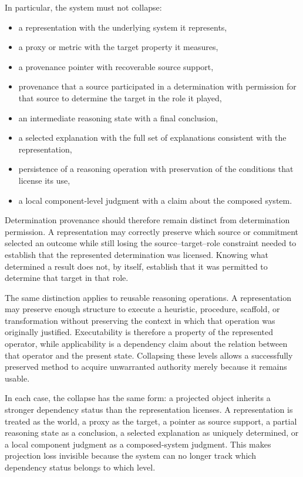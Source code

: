\documentclass[11pt]{article}
\theoremstyle{definition}
\theoremstyle{remark}
\begin{document}
In particular, the system must not collapse:
\begin{itemize}[leftmargin=1.5em]
    \item a representation with the underlying system it represents,
    \item a proxy or metric with the target property it measures,
    \item a provenance pointer with recoverable source support,
    \item provenance that a source participated in a determination with permission for that source to determine the target in the role it played,
    \item an intermediate reasoning state with a final conclusion,
    \item a selected explanation with the full set of explanations consistent with the representation,
    \item persistence of a reasoning operation with preservation of the conditions that license its use,
    \item a local component-level judgment with a claim about the composed system.
\end{itemize}

Determination provenance should therefore remain distinct from determination permission. A representation may correctly preserve which source or commitment selected an outcome while still losing the source--target--role constraint needed to establish that the represented determination was licensed. Knowing what determined a result does not, by itself, establish that it was permitted to determine that target in that role.

The same distinction applies to reusable reasoning operations. A representation may preserve enough structure to execute a heuristic, procedure, scaffold, or transformation without preserving the context in which that operation was originally justified. Executability is therefore a property of the represented operator, while applicability is a dependency claim about the relation between that operator and the present state. Collapsing these levels allows a successfully preserved method to acquire unwarranted authority merely because it remains usable.

In each case, the collapse has the same form: a projected object inherits a stronger dependency status than the representation licenses. A representation is treated as the world, a proxy as the target, a pointer as source support, a partial reasoning state as a conclusion, a selected explanation as uniquely determined, or a local component judgment as a composed-system judgment. This makes projection loss invisible because the system can no longer track which dependency status belongs to which level.
\end{document}
